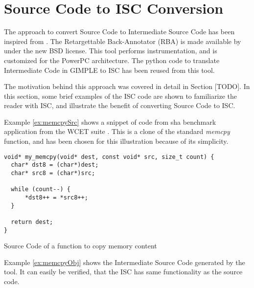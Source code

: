 \chapter{Source Code to ISC Conversion}
\label{app:ir2cConversion}

The approach to convert Source Code to Intermediate Source Code has been inspired from \cite{RBA2013}. The Retargettable Back-Annotator (RBA) is made available by \cite{RBA2013} under the new BSD license. This tool performs instrumentation, and is customized for the PowerPC architecture. The python code to translate Intermediate Code in GIMPLE to ISC has been reused from this tool.

The motivation behind this approach was covered in detail in Section [TODO]. In this section, some brief examples of the ISC code are shown to familiarize the reader with ISC, and illustrate the benefit of converting Source Code to ISC.

Example \ref{ex:memcpySrc} shows a snippet of code from sha benchmark application from the WCET suite \cite{WCET}. This is a clone of the standard \emph{memcpy} function, and has been chosen for this illustration because of its simplicity.

\begin{Example}[h]
\begin{lstlisting}
void* my_memcpy(void* dest, const void* src, size_t count) {
  char* dst8 = (char*)dest;
  char* src8 = (char*)src;

  while (count--) {
      *dst8++ = *src8++;
  }

  return dest;
}
\end{lstlisting}
\caption{Source Code of a function to copy memory content}
\label{ex:memcpySrc}
\end{Example}

Example \ref{ex:memcpyObj} shows the Intermediate Source Code generated by the tool. It can easily be verified, that the ISC has same functionality as the source code.

